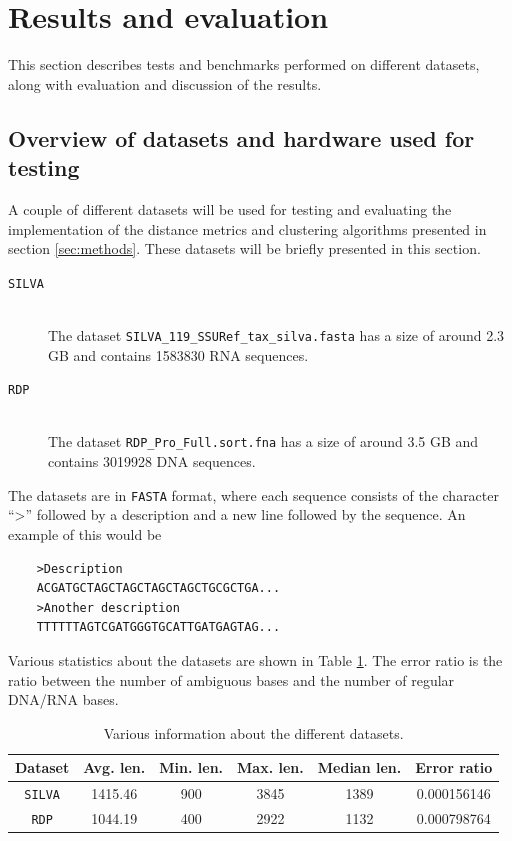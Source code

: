 \section{Results and evaluation} \label{sec:results}

This section describes tests and benchmarks performed on different datasets,
along with evaluation and discussion of the results.

\subsection{Overview of datasets and hardware used for testing}
\label{sec:overview_of_datasets}

A couple of different datasets will be used for testing and evaluating the
implementation of the distance metrics and clustering algorithms presented in
section \ref{sec:methods}. These datasets will be briefly presented in this
section.

\begin{description}
  \item[\texttt{SILVA}] \hfill \\
    The dataset \texttt{SILVA\_119\_SSURef\_tax\_silva.fasta} has a size of
    around 2.3 GB and contains \num{1583830} RNA sequences.

  \item[\texttt{RDP}] \hfill \\
    The dataset \texttt{RDP\_Pro\_Full.sort.fna} has a size of around 3.5 GB
    and contains \num{3019928} DNA sequences.
\end{description}

The datasets are in \texttt{FASTA} format, where each sequence consists of the
character ``>'' followed by a description and a new line followed by the
sequence. An example of this would be
\begin{verbatim}
    >Description
    ACGATGCTAGCTAGCTAGCTAGCTGCGCTGA...
    >Another description
    TTTTTTAGTCGATGGGTGCATTGATGAGTAG...
\end{verbatim}

Various statistics about the datasets are shown in Table \ref{tab:data_stats}.
The error ratio is the ratio between the number of ambiguous bases and the
number of regular DNA/RNA bases.

\begin{table}[H]
  \centering
  \begin{tabular}{c | c | c | c | c | c}
    Dataset        & Avg. len. & Min. len. & Max. len. & Median len. & Error ratio \\
    \hline\hline
    \texttt{SILVA} & \num{1415.46}  & \num{900} & \num{3845} & \num{1389} & 0.000156146 \\
    \texttt{RDP}   & \num{1044.19}  & \num{400} & \num{2922} & \num{1132} & 0.000798764 \\
  \end{tabular}
  \caption{Various information about the different datasets.}
  \label{tab:data_stats}
\end{table}


